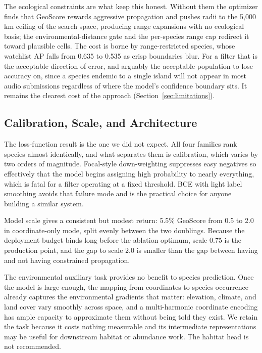 The ecological constraints are what keep this honest. Without them the optimizer finds that GeoScore rewards aggressive propagation and pushes radii to the 5,000\,km ceiling of the search space, producing range expansions with no ecological basis; the environmental-distance gate and the per-species range cap redirect it toward plausible cells. The cost is borne by range-restricted species, whose watchlist AP falls from 0.635 to 0.535 as crisp boundaries blur. For a filter that is the acceptable direction of error, and arguably the acceptable population to lose accuracy on, since a species endemic to a single island will not appear in most audio submissions regardless of where the model's confidence boundary sits. It remains the clearest cost of the approach (Section~\ref{sec:limitations}).

\subsection{Calibration, Scale, and Architecture}
\label{sec:disc-calibration}

The loss-function result is the one we did not expect. All four families rank species almost identically, and what separates them is calibration, which varies by two orders of magnitude. Focal-style down-weighting suppresses easy negatives so effectively that the model begins assigning high probability to nearly everything, which is fatal for a filter operating at a fixed threshold. BCE with light label smoothing avoids that failure mode and is the practical choice for anyone building a similar system.

Model scale gives a consistent but modest return: 5.5\% GeoScore from 0.5 to 2.0 in coordinate-only mode, split evenly between the two doublings. Because the deployment budget binds long before the ablation optimum, scale 0.75 is the production point, and the gap to scale 2.0 is smaller than the gap between having and not having constrained propagation.

The environmental auxiliary task provides no benefit to species prediction. Once the model is large enough, the mapping from coordinates to species occurrence already captures the environmental gradients that matter: elevation, climate, and land cover vary smoothly across space, and a multi-harmonic coordinate encoding has ample capacity to approximate them without being told they exist. We retain the task because it costs nothing measurable and its intermediate representations may be useful for downstream habitat or abundance work. The habitat head is not recommended.


